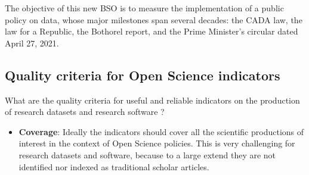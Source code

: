\documentclass[
]{article}
\providecommand{\tightlist}{%
  \setlength{\itemsep}{0pt}\setlength{\parskip}{0pt}}
\begin{document}
The objective of this new BSO is to measure the implementation of a
public policy on data, whose major milestones span several decades: the
CADA law, the law for a Republic, the Bothorel report, and the Prime
Minister's circular dated April 27, 2021.

\hypertarget{quality-criteria-for-open-science-indicators}{%
\subsection{Quality criteria for Open Science
indicators}\label{quality-criteria-for-open-science-indicators}}

What are the quality criteria for useful and reliable indicators on the
production of research datasets and research software ?

\begin{itemize}
\tightlist
\item
  \textbf{Coverage}: Ideally the indicators should cover all the
  scientific productions of interest in the context of Open Science
  policies. This is very challenging for research datasets and software,
  because to a large extend they are not identified nor indexed as
  traditional scholar articles.
\end{itemize}
\end{document}
